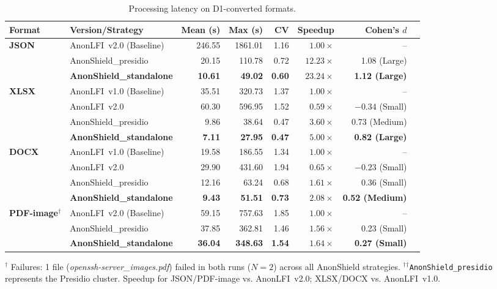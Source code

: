 \documentclass[12pt]{article}
\begin{document}
\begin{table}[!htp]
\centering
\caption{Processing latency on D1-converted formats.}
\label{tab:converted_perf}
\scriptsize
\begin{tabular}{llrrrrrr}
\toprule
\textbf{Format} & \textbf{Version/Strategy} & \textbf{Mean (s)} & \textbf{Max (s)} & \textbf{CV} & \textbf{Speedup} & \textbf{Cohen's $d$} \\
\midrule
\multirow{3}{*}{\textbf{JSON}}
 & AnonLFI~v2.0 (Baseline) & 246.55 & 1861.01 & 1.16 & $1.00\times$ & -- \\
 & AnonShield\_presidio            &  20.15 &   110.78 & 0.72 & $12.23\times$ & 1.08 (Large) \\
 & \textbf{AnonShield\_standalone}&  \textbf{10.61} & \textbf{49.02} & \textbf{0.60} & $\mathbf{23.24\times}$ & \textbf{1.12 (Large)} \\
\midrule
\multirow{4}{*}{\textbf{XLSX}}
 & AnonLFI~v1.0 (Baseline) & 35.51 & 320.73 & 1.37 & $1.00\times$ & -- \\
 & AnonLFI~v2.0            & 60.30 & 596.95 & 1.52 & $0.59\times$ & $-0.34$ (Small) \\
 & AnonShield\_presidio            &  9.86 &  38.64 & 0.47 & $3.60\times$ & 0.73 (Medium) \\
 & \textbf{AnonShield\_standalone}&  \textbf{7.11} & \textbf{27.95} & \textbf{0.47} & $\mathbf{5.00\times}$ & \textbf{0.82 (Large)} \\
\midrule
\multirow{4}{*}{\textbf{DOCX}}
 & AnonLFI~v1.0 (Baseline) & 19.58 & 186.55 & 1.34 & $1.00\times$ & -- \\
 & AnonLFI~v2.0            & 29.90 & 431.60 & 1.94 & $0.65\times$ & $-0.23$ (Small) \\
 & AnonShield\_presidio            & 12.16 &  63.24 & 0.68 & $1.61\times$ & 0.36 (Small) \\
 & \textbf{AnonShield\_standalone}&  \textbf{9.43} & \textbf{51.51} & \textbf{0.73} & $\mathbf{2.08\times}$ & \textbf{0.52 (Medium)} \\
\midrule
\multirow{3}{*}{\textbf{PDF-image$^{\dag}$}}
 & AnonLFI~v2.0 (Baseline) & 59.15 & 757.63 & 1.85 & $1.00\times$ & -- \\
 & AnonShield\_presidio            & 37.85 & 362.81 & 1.46 & $1.56\times$ & 0.23 (Small) \\
 & \textbf{AnonShield\_standalone}& \textbf{36.04} & \textbf{348.63} & \textbf{1.54} & $\mathbf{1.64\times}$ & \textbf{0.27 (Small)} \\
\bottomrule
\end{tabular}

{\scriptsize
$^{\dag}$ Failures: 1 file (\textit{openssh-server\_images.pdf}) failed in both runs ($N=2$) across all AnonShield strategies. $^{\dag}$$^{\dag}$\texttt{AnonShield\_presidio} represents the Presidio cluster. Speedup for JSON/PDF-image vs. AnonLFI~v2.0; XLSX/DOCX vs. AnonLFI~v1.0.}
\end{table}
\end{document}
